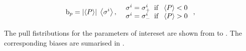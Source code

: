 \begin{equation}
{\rm b}_p = \left|\left<P\right>\right| \; \left<\sigma^i\right>,\;\; \left. 
  \begin{array}{ll}
    \sigma^i = \sigma^i_+ \;\;{\rm if}\;\; \left<P\right> < 0 \\
    \sigma^i = \sigma^i_- \;\;{\rm if}\;\; \left<P\right> > 0
  \end{array} \right. ,
\label{bias_def}
\end{equation}

The pull fistributions for the parameters of intereset are shown from  to .
The corresponding biases are sumarised in .

\begin{figure}[!h]
  \centering
  \begin{subfigure}{0.5\textwidth}
    \scalebox{0.60}{}
    \caption{}
    \label{pull_ASMag2_bin1}
  \end{subfigure}%
  \hfill%
  \begin{subfigure}{0.5\textwidth}
    \scalebox{0.60}{}
    \caption{}
    \label{pull_ASPhase_bin1}
  \end{subfigure}
  \begin{subfigure}{0.5\textwidth}
    \scalebox{0.60}{}
    \caption{}
    \label{pull_ASMag2_bin2}
  \end{subfigure}%
  \hfill%
  \begin{subfigure}{0.5\textwidth}
    \scalebox{0.60}{}
    \caption{}
    \label{pull_ASPhase_bin2}
  \end{subfigure}
  \begin{subfigure}{0.5\textwidth}
    \scalebox{0.60}{}
    \caption{}
    \label{pull_ASMag2_bin2}
  \end{subfigure}%
  \hfill%
  \begin{subfigure}{0.5\textwidth}
    \scalebox{0.60}{}
    \caption{}
    \label{pull_ASPhase_bin3}
  \end{subfigure}
  \begin{subfigure}{0.5\textwidth}

\end{subfigure}
\end{figure}

